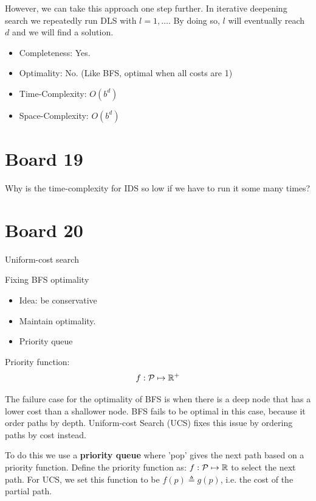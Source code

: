 \documentclass[10pt]{article}
\begin{document}
However, we can take this approach one step further. In iterative deepening search we repeatedly run DLS with $l = 1, \ldots$. By doing so, $l$ will eventually reach $d$ and we will find a solution. 

\begin{itemize}
\item Completeness: Yes.
\item Optimality: No. (Like BFS, optimal when all costs are 1)
\item Time-Complexity: $O(b^d)$ 
\item Space-Complexity: $O(b^d)$ 
\end{itemize}

\section{Board 19}
\begin{exercise}
  Why is the time-complexity for IDS so low if we have to run it some many times?
\end{exercise}




\section{Board 20}

Uniform-cost search

Fixing BFS optimality

\begin{itemize}
\item Idea: be conservative
\item Maintain optimality.
\item Priority queue
\end{itemize}

Priority function: \[f:\mathcal{P} \mapsto \mathbb{R}^+\]


The failure case for the optimality of BFS is when there is a deep
node that has a lower cost than a shallower node. BFS fails to be
optimal in this case, because it order paths by depth. Uniform-cost
Search (UCS) fixes this issue by ordering paths by cost instead. 

To do this we use a \textbf{priority queue} where 'pop' gives the next
path based on a priority function. Define the priority function as:
$f:\mathcal{P} \mapsto \mathbb{R}$ to select the next path. For UCS, we set this
function to be $f(p)\triangleq g(p)$, i.e. the cost of the partial
path.
\end{document}
